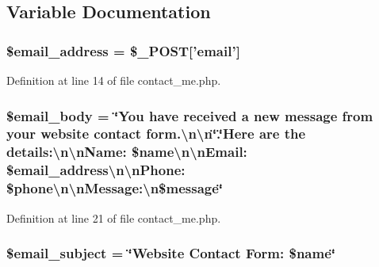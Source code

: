 \subsection{Variable Documentation}
\hypertarget{contact__me_8php_a773bb6f6146878ed0ff7059eda635549}{
\subsubsection[{\$email\+\_\+address}]{\setlength{\rightskip}{0pt plus 5cm}\$email\+\_\+address = \$\+\_\+\+P\+O\+S\+T\mbox{[}'email'\mbox{]}}}\label{contact__me_8php_a773bb6f6146878ed0ff7059eda635549}


Definition at line 14 of file contact\+\_\+me.\+php.

\hypertarget{contact__me_8php_ae8d78bb1129ef7c43c7d9aebc4fa3ad8}{
\subsubsection[{\$email\+\_\+body}]{\setlength{\rightskip}{0pt plus 5cm}\$email\+\_\+body = \char`\"{}You have received {\bf a} new message from your website contact form.\textbackslash{}n\textbackslash{}n\char`\"{}.\char`\"{}Here are the details\+:\textbackslash{}n\textbackslash{}n\+Name\+: \$name\textbackslash{}n\textbackslash{}n\+Email\+: \$email\+\_\+address\textbackslash{}n\textbackslash{}n\+Phone\+: \$phone\textbackslash{}n\textbackslash{}n\+Message\+:\textbackslash{}n\$message\char`\"{}}}\label{contact__me_8php_ae8d78bb1129ef7c43c7d9aebc4fa3ad8}


Definition at line 21 of file contact\+\_\+me.\+php.

\hypertarget{contact__me_8php_a8b423a7af7e669b288eacca16f0aab0b}{
\subsubsection[{\$email\+\_\+subject}]{\setlength{\rightskip}{0pt plus 5cm}\$email\+\_\+subject = \char`\"{}Website Contact Form\+: \$name\char`\"{}}}\label{contact__me_8php_a8b423a7af7e669b288eacca16f0aab0b}


